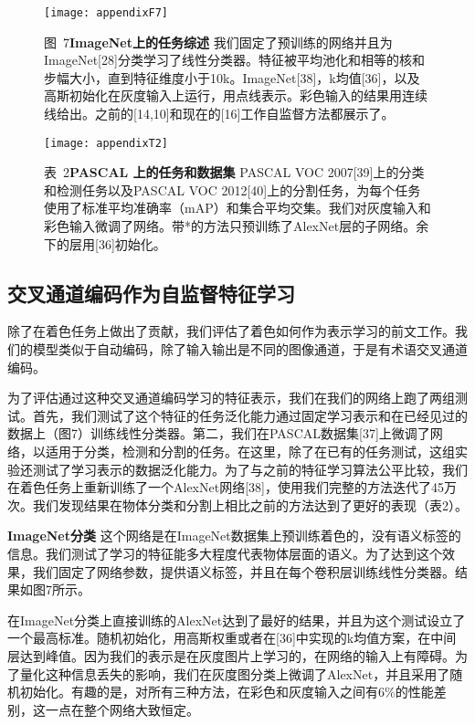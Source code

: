 \begin{figure}[h]
  \centering
  \texttt{[image: appendixF7]}
  \caption*{图~7\quad \textbf{ImageNet上的任务综述} 我们固定了预训练的网络并且为ImageNet[28]分类学习了线性分类器。特征被平均池化和相等的核和步幅大小，直到特征维度小于10k。ImageNet[38]，k均值[36]，以及高斯初始化在灰度输入上运行，用点线表示。彩色输入的结果用连续线给出。之前的[14,10]和现在的[16]工作自监督方法都展示了。}
  \label{tab:badfigure8}
\end{figure}

\begin{figure}[h]
  \centering
  \texttt{[image: appendixT2]}
  \caption*{表~2\quad \textbf{PASCAL 上的任务和数据集} PASCAL VOC 2007[39]上的分类和检测任务以及PASCAL VOC 2012[40]上的分割任务，为每个任务使用了标准平均准确率（mAP）和集合平均交集。我们对灰度输入和彩色输入微调了网络。带*的方法只预训练了AlexNet层的子网络。余下的层用[36]初始化。}
  \label{tab:badfigure9}
\end{figure}

\subsection{交叉通道编码作为自监督特征学习}

除了在着色任务上做出了贡献，我们评估了着色如何作为表示学习的前文工作。我们的模型类似于自动编码，除了输入输出是不同的图像通道，于是有术语交叉通道编码。

为了评估通过这种交叉通道编码学习的特征表示，我们在我们的网络上跑了两组测试。首先，我们测试了这个特征的任务泛化能力通过固定学习表示和在已经见过的数据上（图7）训练线性分类器。第二，我们在PASCAL数据集[37]上微调了网络，以适用于分类，检测和分割的任务。在这里，除了在已有的任务测试，这组实验还测试了学习表示的数据泛化能力。为了与之前的特征学习算法公平比较，我们在着色任务上重新训练了一个AlexNet网络[38]，使用我们完整的方法迭代了45万次。我们发现结果在物体分类和分割上相比之前的方法达到了更好的表现（表2）。

\textbf{ImageNet分类 } 这个网络是在ImageNet数据集上预训练着色的，没有语义标签的信息。我们测试了学习的特征能多大程度代表物体层面的语义。为了达到这个效果，我们固定了网络参数，提供语义标签，并且在每个卷积层训练线性分类器。结果如图7所示。

在ImageNet分类上直接训练的AlexNet达到了最好的结果，并且为这个测试设立了一个最高标准。随机初始化，用高斯权重或者在[36]中实现的k均值方案，在中间层达到峰值。因为我们的表示是在灰度图片上学习的，在网络的输入上有障碍。为了量化这种信息丢失的影响，我们在灰度图分类上微调了AlexNet，并且采用了随机初始化。有趣的是，对所有三种方法，在彩色和灰度输入之间有6\%的性能差别，这一点在整个网络大致恒定。

